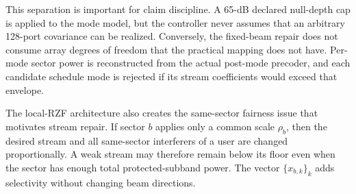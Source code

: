 \documentclass[journal]{IEEEtran}
\begin{document}
This separation is important for claim discipline. A 65-dB declared null-depth cap is applied to the mode model, but the controller never assumes that an arbitrary 128-port covariance can be realized. Conversely, the fixed-beam repair does not consume array degrees of freedom that the practical mapping does not have. Per-mode sector power is reconstructed from the actual post-mode precoder, and each candidate schedule mode is rejected if its stream coefficients would exceed that envelope.

The local-RZF architecture also creates the same-sector fairness issue that motivates stream repair. If sector $b$ applies only a common scale $\rho_b$, then the desired stream and all same-sector interferers of a user are changed proportionally. A weak stream may therefore remain below its floor even when the sector has enough total protected-subband power. The vector $\{x_{b,k}\}_k$ adds selectivity without changing beam directions.


\end{document}
